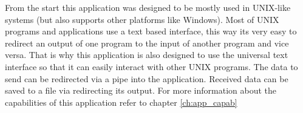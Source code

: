 From the start this application was designed to be mostly used in UNIX-like systems (but also supports other platforms like Windows). Most of UNIX programs and applications use a text based interface, this way its very easy to redirect an output of one program to the input of another program and vice versa. That is why this application is also designed to use the universal text interface so that it can easily interact with other UNIX programs. The data to send can be redirected via a pipe into the application. Received data can be saved to a file via redirecting its output. For more information about the capabilities of this application refer to chapter \ref{ch:app_capab}